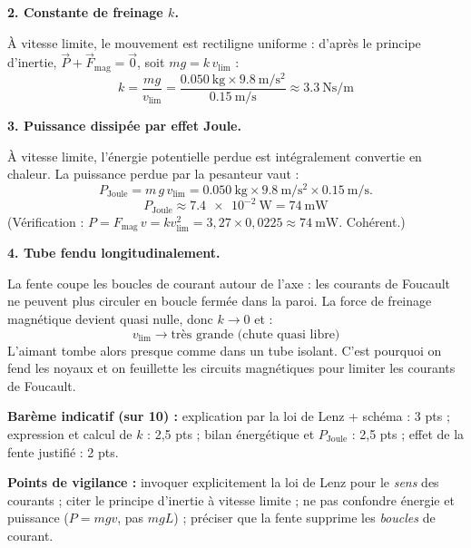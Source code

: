 \documentclass[11pt]{article}
\begin{document}
\begin{corrige}
\textbf{2. Constante de freinage $k$.}

À vitesse limite, le mouvement est rectiligne uniforme : d'après le principe d'inertie, $\vec{P} + \vec{F}_{\text{mag}} = \vec{0}$, soit $m g = k\,v_{\text{lim}}$ :
\[
\boxed{k = \dfrac{m g}{v_{\text{lim}}} = \dfrac{\SI{0,050}{\kilogram}\times \SI{9,8}{\meter\per\second\squared}}{\SI{0,15}{\meter\per\second}} \approx \SI{3,3}{\newton\second\per\meter}}
\]

\textbf{3. Puissance dissipée par effet Joule.}

À vitesse limite, l'énergie potentielle perdue est intégralement convertie en chaleur. La puissance perdue par la pesanteur vaut :
\[
P_{\text{Joule}} = m\,g\,v_{\text{lim}} = \SI{0,050}{\kilogram}\times \SI{9,8}{\meter\per\second\squared}\times \SI{0,15}{\meter\per\second}.
\]
\[
\boxed{P_{\text{Joule}} \approx \SI{7,4e-2}{\watt} = \SI{74}{\milli\watt}}
\]
(Vérification : $P = F_{\text{mag}}\,v = k v_{\text{lim}}^2 = 3,27\times 0,0225 \approx \SI{74}{\milli\watt}$. Cohérent.)

\textbf{4. Tube fendu longitudinalement.}

La fente coupe les boucles de courant autour de l'axe : les courants de Foucault ne peuvent plus circuler en boucle fermée dans la paroi. La force de freinage magnétique devient quasi nulle, donc $k \to 0$ et :
\[
\boxed{v_{\text{lim}} \to \text{très grande (chute quasi libre)}}
\]
L'aimant tombe alors presque comme dans un tube isolant. C'est pourquoi on fend les noyaux et on feuillette les circuits magnétiques pour limiter les courants de Foucault.

\textbf{Barème indicatif (sur 10) :} explication par la loi de Lenz + schéma : 3 pts ; expression et calcul de $k$ : 2,5 pts ; bilan énergétique et $P_{\text{Joule}}$ : 2,5 pts ; effet de la fente justifié : 2 pts.

\textbf{Points de vigilance :} invoquer explicitement la loi de Lenz pour le \emph{sens} des courants ; citer le principe d'inertie à vitesse limite ; ne pas confondre énergie et puissance ($P = mgv$, pas $mgL$) ; préciser que la fente supprime les \emph{boucles} de courant.
\end{corrige}
\end{document}
